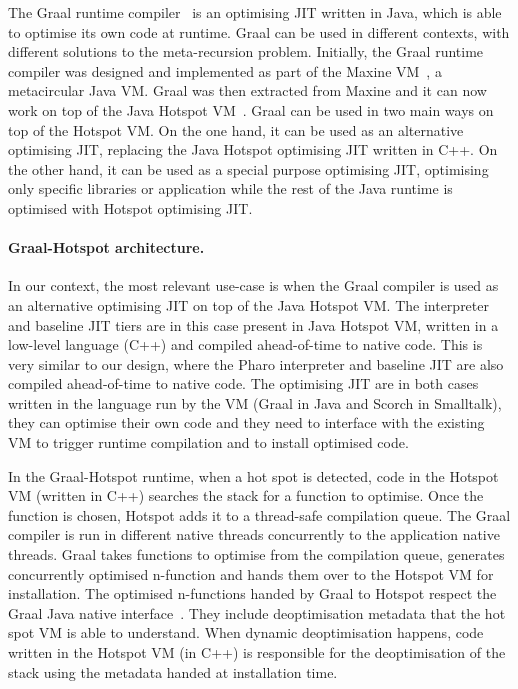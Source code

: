 \documentclass[a4paper,12pt,twoside]{../includes/ThesisStyle}
\begin{document}
The Graal runtime compiler~\cite{Oracle13,Dubo13c} is an optimising JIT written in Java, which is able to optimise its own code at runtime. Graal can be used in different contexts, with different solutions to the meta-recursion problem. Initially, the Graal runtime compiler was designed and implemented as part of the Maxine VM~\cite{Wimm13a}, a metacircular Java VM. Graal was then extracted from Maxine and it can now work on top of the Java Hotspot VM~\cite{Pale01a}. Graal can be used in two main ways on top of the Hotspot VM. On the one hand, it can be used as an alternative optimising JIT, replacing the Java Hotspot optimising JIT written in C++. On the other hand, it can be used as a special purpose optimising JIT, optimising only specific libraries or application while the rest of the Java runtime is optimised with Hotspot optimising JIT. %

\paragraph{Graal-Hotspot architecture.} In our context, the most relevant use-case is when the Graal compiler is used as an alternative optimising JIT on top of the Java Hotspot VM. The interpreter and baseline JIT tiers are in this case present in Java Hotspot VM, written in a low-level language (C++) and compiled ahead-of-time to native code. This is very similar to our design, where the Pharo interpreter and baseline JIT are also compiled ahead-of-time to native code. The optimising JIT are in both cases written in the language run by the VM (Graal in Java and Scorch in Smalltalk), they can optimise their own code and they need to interface with the existing VM to trigger runtime compilation and to install optimised code.

In the Graal-Hotspot runtime, when a hot spot is detected, code in the Hotspot VM (written in C++) searches the stack for a function to optimise. Once the function is chosen, Hotspot adds it to a thread-safe compilation queue. The Graal compiler is run in different native threads concurrently to the application native threads. Graal takes functions to optimise from the compilation queue, generates concurrently optimised n-function and hands them over to the Hotspot VM for installation. The optimised n-functions handed by Graal to Hotspot respect the Graal Java native interface~\cite{Grim13a}. They include deoptimisation metadata that the hot spot VM is able to understand. When dynamic deoptimisation happens, code written in the Hotspot VM (in C++) is responsible for the deoptimisation of the stack using the metadata handed at installation time.
\end{document}
